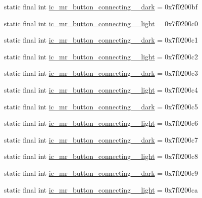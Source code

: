 \begin{CompactItemize}
\item 
static final int \hyperlink{classandroid_1_1support_1_1v4_1_1_r_1_1drawable_0773a563c5f97b27888b066433b61214}{ic\_\-mr\_\-button\_\-connecting\_\_\-dark} = 0x7f0200bf
\item 
static final int \hyperlink{classandroid_1_1support_1_1v4_1_1_r_1_1drawable_f1d6a7bbc17543cbf60693850974256c}{ic\_\-mr\_\-button\_\-connecting\_\_\-light} = 0x7f0200c0
\item 
static final int \hyperlink{classandroid_1_1support_1_1v4_1_1_r_1_1drawable_4e20e1c0da8126f0ae71000b13cae32c}{ic\_\-mr\_\-button\_\-connecting\_\_\-dark} = 0x7f0200c1
\item 
static final int \hyperlink{classandroid_1_1support_1_1v4_1_1_r_1_1drawable_12405fd78c5c03981552b59a1bfb9099}{ic\_\-mr\_\-button\_\-connecting\_\_\-light} = 0x7f0200c2
\item 
static final int \hyperlink{classandroid_1_1support_1_1v4_1_1_r_1_1drawable_10dc35d9929d6611f2ec68bad62ad093}{ic\_\-mr\_\-button\_\-connecting\_\_\-dark} = 0x7f0200c3
\item 
static final int \hyperlink{classandroid_1_1support_1_1v4_1_1_r_1_1drawable_d2f5d52a9e24d7c6468ff70370722d46}{ic\_\-mr\_\-button\_\-connecting\_\_\-light} = 0x7f0200c4
\item 
static final int \hyperlink{classandroid_1_1support_1_1v4_1_1_r_1_1drawable_fde15255a66ebfc272adbb22275edab6}{ic\_\-mr\_\-button\_\-connecting\_\_\-dark} = 0x7f0200c5
\item 
static final int \hyperlink{classandroid_1_1support_1_1v4_1_1_r_1_1drawable_5fbffd9fd61f41c7fba04ac12d2b4a0c}{ic\_\-mr\_\-button\_\-connecting\_\_\-light} = 0x7f0200c6
\item 
static final int \hyperlink{classandroid_1_1support_1_1v4_1_1_r_1_1drawable_973d200362de44344e6aa3d1e9831c72}{ic\_\-mr\_\-button\_\-connecting\_\_\-dark} = 0x7f0200c7
\item 
static final int \hyperlink{classandroid_1_1support_1_1v4_1_1_r_1_1drawable_42869823d02a9d98b26f7f99456667ab}{ic\_\-mr\_\-button\_\-connecting\_\_\-light} = 0x7f0200c8
\item 
static final int \hyperlink{classandroid_1_1support_1_1v4_1_1_r_1_1drawable_5dc6f7bc8dd14e525cc480835da126c9}{ic\_\-mr\_\-button\_\-connecting\_\_\-dark} = 0x7f0200c9
\item 
static final int \hyperlink{classandroid_1_1support_1_1v4_1_1_r_1_1drawable_3e4c2cb8536d4a0ab8fdb4434d5d9d70}{ic\_\-mr\_\-button\_\-connecting\_\_\-light} = 0x7f0200ca

\end{CompactItemize}
